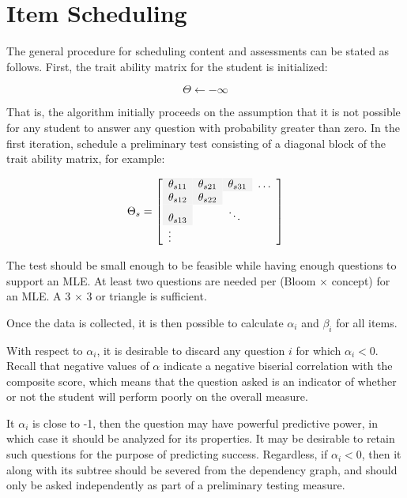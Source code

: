 \section{Item Scheduling}

The general procedure for scheduling content and assessments can be stated as
follows.  First, the trait ability matrix for the student is initialized:

\begin{equation}
  \Theta \leftarrow -\infty
\end{equation}

That is, the algorithm initially proceeds on the assumption that it is not
possible for any student to answer any question with probability greater than
zero.  In the first iteration, schedule a preliminary test consisting of a
diagonal block of the trait ability matrix, for example:

\begin{equation}
\Theta_s =\left[
         \begin{array}{llll}
              \y\theta_{s11} & \y\theta_{s21} & \y\theta_{s31} & \ldots \\
              \y\theta_{s12} & \y\theta_{s22} &                 &        \\
              \y\theta_{s13} &                 & \ddots          &        \\
              \vdots          &                 &                 &        \\
         \end{array}
       \right]
\end{equation}

The test should be small enough to be feasible while having enough questions to
support an MLE.  At least two questions are needed per (Bloom $\times$ concept)
for an MLE.  A 3 $\times$ 3 or triangle is sufficient.

Once the data is collected, it is then possible to calculate $\alpha_i$ and
$\beta_i$ for all items. 

With respect to $\alpha_i$, it is desirable to discard any question $i$ for
which $\alpha_i < 0$.  Recall that negative values of $\alpha$ indicate a
negative biserial correlation with the composite score, which means that the
question asked is an indicator of whether or not the student will perform
poorly on the overall measure.  

It $\alpha_i$ is close to -1, then the question may have powerful predictive
power, in which case it should be analyzed for its properties.  It may be
desirable to retain such questions for the purpose of predicting success.
Regardless, if $\alpha_i < 0$, then it along with its subtree should be severed
from the dependency graph, and should only be asked independently as part
of a preliminary testing measure.

